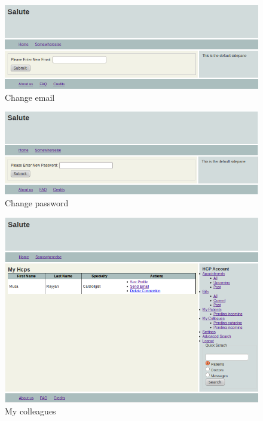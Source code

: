 \documentclass[10pt]{report}
\begin{document}
\begin{figure}
\includegraphics[scale=0.6]{screenshots/change_email.png}
\caption{Change email}
\end{figure}

\begin{figure}
\includegraphics[scale=0.6]{screenshots/change_password.png}
\caption{Change password}
\end{figure}

\begin{figure}
\includegraphics[scale=0.6]{screenshots/my_colleagues.png}
\caption{My colleagues}
\end{figure}
\end{document}
